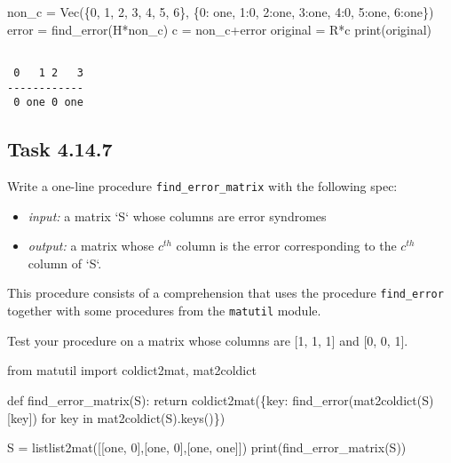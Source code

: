 \documentclass[
  letterpaper,
  DIV=11,
  numbers=noendperiod]{scrartcl}
\newenvironment{Shaded}{\begin{snugshade}}{\end{snugshade}}
\newcommand{\BuiltInTok}[1]{\textcolor[rgb]{0.00,0.23,0.31}{#1}}
\newcommand{\ControlFlowTok}[1]{\textcolor[rgb]{0.00,0.23,0.31}{#1}}
\newcommand{\DecValTok}[1]{\textcolor[rgb]{0.68,0.00,0.00}{#1}}
\newcommand{\ImportTok}[1]{\textcolor[rgb]{0.00,0.46,0.62}{#1}}
\newcommand{\KeywordTok}[1]{\textcolor[rgb]{0.00,0.23,0.31}{#1}}
\newcommand{\NormalTok}[1]{\textcolor[rgb]{0.00,0.23,0.31}{#1}}
\newcommand{\OperatorTok}[1]{\textcolor[rgb]{0.37,0.37,0.37}{#1}}
\begin{document}
\begin{Shaded}
\begin{Highlighting}[numbers=left,,]
\NormalTok{non\_c }\OperatorTok{=}\NormalTok{ Vec(\{}\DecValTok{0}\NormalTok{, }\DecValTok{1}\NormalTok{, }\DecValTok{2}\NormalTok{, }\DecValTok{3}\NormalTok{, }\DecValTok{4}\NormalTok{, }\DecValTok{5}\NormalTok{, }\DecValTok{6}\NormalTok{\}, \{}\DecValTok{0}\NormalTok{: one, }\DecValTok{1}\NormalTok{:}\DecValTok{0}\NormalTok{, }\DecValTok{2}\NormalTok{:one, }\DecValTok{3}\NormalTok{:one, }\DecValTok{4}\NormalTok{:}\DecValTok{0}\NormalTok{, }\DecValTok{5}\NormalTok{:one, }\DecValTok{6}\NormalTok{:one\})}
\NormalTok{error }\OperatorTok{=}\NormalTok{ find\_error(H}\OperatorTok{*}\NormalTok{non\_c)}
\NormalTok{c }\OperatorTok{=}\NormalTok{ non\_c}\OperatorTok{+}\NormalTok{error}
\NormalTok{original }\OperatorTok{=}\NormalTok{ R}\OperatorTok{*}\NormalTok{c}
\BuiltInTok{print}\NormalTok{(original)}
\end{Highlighting}
\end{Shaded}

\begin{lstlisting}

 0   1 2   3
------------
 0 one 0 one
\end{lstlisting}

\hypertarget{task-4.14.7}{%
\subsection{Task 4.14.7}\label{task-4.14.7}}

Write a one-line procedure \texttt{find\_error\_matrix} with the
following spec:

\begin{itemize}
\item \textit{input:} a matrix `S` whose columns are error syndromes
\item \textit{output:} a matrix whose $c^{th}$ column is the error corresponding to the $c^{th}$ column of `S`.
\end{itemize}

This procedure consists of a comprehension that uses the procedure
\texttt{find\_error} together with some procedures from the
\texttt{matutil} module.

Test your procedure on a matrix whose columns are {[}1, 1, 1{]} and
{[}0, 0, 1{]}.

\begin{Shaded}
\begin{Highlighting}[numbers=left,,]
\ImportTok{from}\NormalTok{ matutil }\ImportTok{import}\NormalTok{ coldict2mat, mat2coldict}

\KeywordTok{def}\NormalTok{ find\_error\_matrix(S):}
  \ControlFlowTok{return}\NormalTok{ coldict2mat(\{key: find\_error(mat2coldict(S)[key]) }\ControlFlowTok{for}\NormalTok{ key }\KeywordTok{in}\NormalTok{ mat2coldict(S).keys()\})}

\NormalTok{S }\OperatorTok{=}\NormalTok{ listlist2mat([[one, }\DecValTok{0}\NormalTok{],[one, }\DecValTok{0}\NormalTok{],[one, one]])}
\BuiltInTok{print}\NormalTok{(find\_error\_matrix(S))}
\end{Highlighting}
\end{Shaded}
\end{document}
